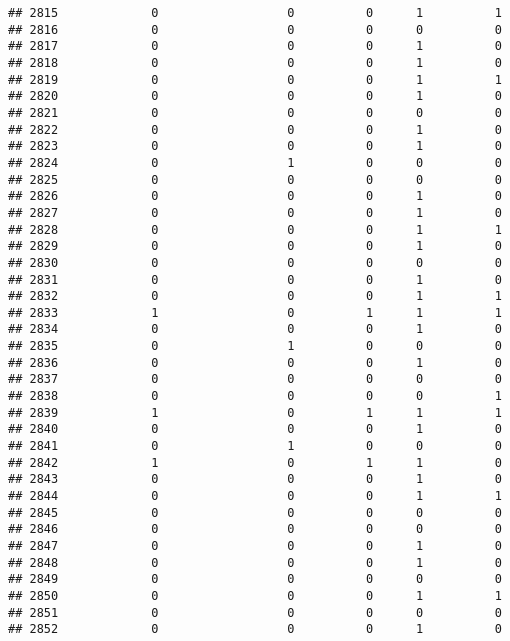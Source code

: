 \documentclass[
]{article}
\begin{document}
\begin{verbatim}
## 2815             0                  0          0      1          1
## 2816             0                  0          0      0          0
## 2817             0                  0          0      1          0
## 2818             0                  0          0      1          0
## 2819             0                  0          0      1          1
## 2820             0                  0          0      1          0
## 2821             0                  0          0      0          0
## 2822             0                  0          0      1          0
## 2823             0                  0          0      1          0
## 2824             0                  1          0      0          0
## 2825             0                  0          0      0          0
## 2826             0                  0          0      1          0
## 2827             0                  0          0      1          0
## 2828             0                  0          0      1          1
## 2829             0                  0          0      1          0
## 2830             0                  0          0      0          0
## 2831             0                  0          0      1          0
## 2832             0                  0          0      1          1
## 2833             1                  0          1      1          1
## 2834             0                  0          0      1          0
## 2835             0                  1          0      0          0
## 2836             0                  0          0      1          0
## 2837             0                  0          0      0          0
## 2838             0                  0          0      0          1
## 2839             1                  0          1      1          1
## 2840             0                  0          0      1          0
## 2841             0                  1          0      0          0
## 2842             1                  0          1      1          0
## 2843             0                  0          0      1          0
## 2844             0                  0          0      1          1
## 2845             0                  0          0      0          0
## 2846             0                  0          0      0          0
## 2847             0                  0          0      1          0
## 2848             0                  0          0      1          0
## 2849             0                  0          0      0          0
## 2850             0                  0          0      1          1
## 2851             0                  0          0      0          0
## 2852             0                  0          0      1          0

\end{verbatim}
\end{document}
